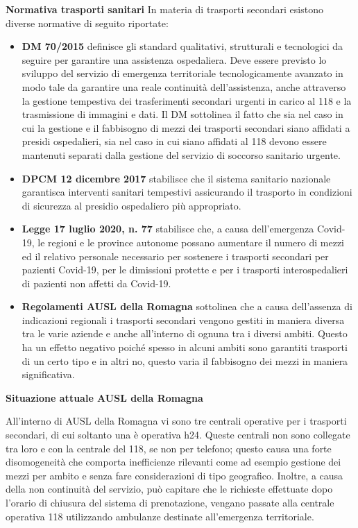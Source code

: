 \documentclass[12pt]{article}
\begin{document}
\textbf{Normativa trasporti sanitari}
In materia di trasporti secondari esistono diverse normative di seguito riportate:

\begin{itemize}
    \item \textbf{DM 70/2015} definisce gli standard qualitativi, strutturali e tecnologici da seguire per garantire una assistenza ospedaliera.
    Deve essere previsto lo sviluppo del servizio di emergenza territoriale tecnologicamente avanzato in modo tale da garantire una reale continuità dell'assistenza, anche attraverso la gestione tempestiva dei trasferimenti secondari urgenti in carico al 118 e la trasmissione di immagini e dati.
    Il DM sottolinea il fatto che sia nel caso in cui la gestione e il fabbisogno di mezzi dei trasporti secondari siano affidati a presidi ospedalieri, sia nel caso in cui siano affidati al 118 devono essere mantenuti separati dalla gestione del servizio di soccorso sanitario urgente.
    \item \textbf{DPCM 12 dicembre 2017} stabilisce che il sistema sanitario nazionale garantisca interventi sanitari tempestivi assicurando il trasporto in condizioni di sicurezza al presidio ospedaliero più appropriato.
    \item \textbf{Legge 17 luglio 2020, n. 77} stabilisce che, a causa dell'emergenza Covid-19, le regioni e le province autonome possano aumentare il numero di mezzi ed il relativo personale necessario per sostenere i trasporti secondari per pazienti Covid-19, per le dimissioni protette e per i trasporti interospedalieri di pazienti non affetti da Covid-19.
    \item \textbf{Regolamenti AUSL della Romagna} sottolinea che a causa dell'assenza di indicazioni regionali i trasporti secondari vengono gestiti in maniera diversa tra le varie aziende e anche all'interno di ognuna tra i diversi ambiti. Questo ha un effetto negativo poiché spesso in alcuni ambiti sono garantiti trasporti di un certo tipo e in altri no, questo varia il fabbisogno dei mezzi in maniera significativa.
\end{itemize}

\textbf{Situazione attuale AUSL della Romagna}

All'interno di AUSL della Romagna vi sono tre centrali operative per i trasporti secondari, di cui soltanto una è operativa h24. Queste centrali non sono collegate tra loro e con la centrale del 118, se non per telefono; questo causa una forte disomogeneità che comporta inefficienze rilevanti come ad esempio gestione dei mezzi per ambito e senza fare considerazioni di tipo geografico.
Inoltre, a causa della non continuità del servizio, può capitare che le richieste effettuate dopo l'orario di chiusura del sistema di prenotazione, vengano passate alla centrale operativa 118 utilizzando ambulanze destinate all'emergenza territoriale.
\end{document}
